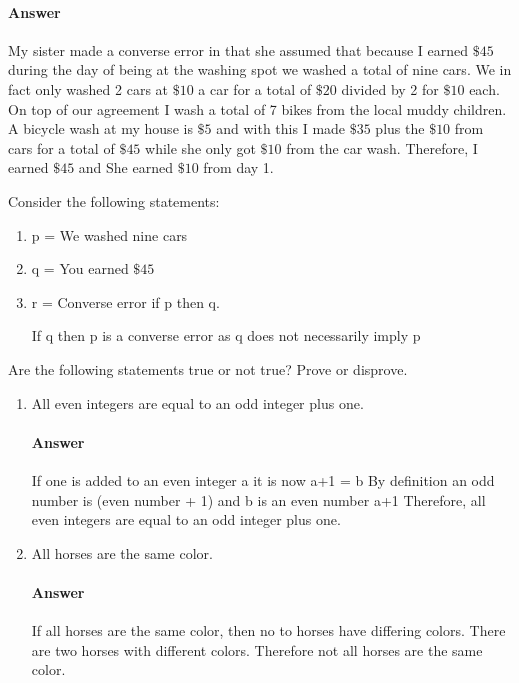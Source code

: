 \documentclass{article}
\begin{document}
\paragraph{Answer}

My sister made a converse error in that she assumed that because I earned $\$45$
during the day of being at the washing spot we washed a total of nine cars.
We in fact only washed 2 cars at $\$10$ a car for a total of
$\$20$ divided by 2 for $\$10$ each. On top of our agreement I wash a total of 7 bikes
from the local muddy children. A bicycle wash at my house is $\$5$ and with this
I made $\$35$ plus the $\$10$ from cars for a total of $\$45$ while she only got $\$10$
from the car wash. Therefore, I earned $\$45$ and She earned $\$10$ from day 1.

Consider the following statements:
\begin{enumerate}
    \item p = We washed nine cars
    \item q = You earned $\$45$
    \item r = Converse error if p then q.

If q then p is a converse error as q does not necessarily imply p
\end{enumerate}




Are the following statements true or not true?    Prove or disprove.

\begin{enumerate}

    \item All even integers are equal to an odd integer plus one.

        \paragraph{Answer}
        If one is added to an even integer a it is now a+1 = b
        By definition an odd number is (even number + 1) and
        b is an even number a+1
        Therefore, all even integers are equal to an odd integer plus one.

    \item All horses are the same color.

        \paragraph{Answer}
        If all horses are the same color, then no to horses have
        differing colors.
        There are two horses with different colors.
        Therefore not all horses are the same color.

\end{enumerate}
\end{document}

